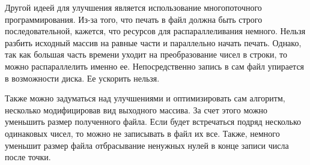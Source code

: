 Другой идеей для улучшения является использование многопоточного программирования. 
Из-за того, что печать в файл должна быть строго последовательной, кажется, что ресурсов для распараллеливания немного.
Нельзя разбить исходный массив на равные части и параллельно начать печать.
Однако, так как большая часть времени уходит на преобразование чисел в строки, то можно распараллелить именно ее.
Непосредственно запись в сам файл упирается в возможности диска. 
Ее ускорить нельзя.

Также можно задуматься над улучшениями и оптимизировать сам алгоритм, несколько модифицировав вид выходного массива.
За счет этого можно уменьшить размер полученного файла.
Если будет встречаться подряд несколько одинаковых чисел, то можно не записывать в файл их все.
Также, немного уменьшит размер файла отбрасывание ненужных нулей в конце записи числа после точки.

